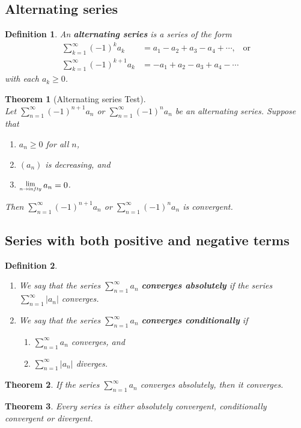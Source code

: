 \documentclass[8pt]{article}
\newcommand{\Lim}[1]{\raisebox{0.5ex}{\scalebox{0.8}{$\displaystyle \lim_{#1}\;$}}}
\newtheorem{definition}{Definition}[section]
\newtheorem{theorem}{Theorem}[section]
\theoremstyle{definition}
\begin{document}
\subsection{Alternating series}
\begin{definition}\normalfont An \textbf{alternating series} is a series of the form
\[
\begin{aligned}
\sum_{k=1}^\infty (-1)^k a_k&=a_1-a_2+a_3-a_4+\cdots,\;\;\;\text{or}\\
\sum_{k=1}^\infty (-1)^{k+1} a_k&=-a_1+a_2-a_3+a_4-\cdots
\end{aligned}
\]
with each $a_k\geq 0$.
\end{definition}
\begin{theorem}[Alternating series Test]
\hfill\\\normalfont Let $\sum_{n=1}^\infty (-1)^{n+1}a_n$ or $\sum_{n=1}^\infty (-1)^{n}a_n$ be an alternating series. Suppose that
\begin{enumerate}
\item $a_n\geq 0$ for all $n$,
\item $(a_n)$ is decreasing, and
\item $\Lim{n\to infty}a_n = 0$.
\end{enumerate}
Then $\sum_{n=1}^\infty (-1)^{n+1}a_n$ or $\sum_{n=1}^\infty (-1)^{n}a_n$ is convergent.
\end{theorem}
\subsection{Series with both positive and negative terms}
\begin{definition}\hfill\\\normalfont
\begin{enumerate}
\item We say that the series $\sum_{n=1}^\infty a_n$ \textbf{converges absolutely} if the series $\sum_{n=1}^\infty |a_n|$ converges.
\item We say that the series $\sum_{n=1}^\infty a_n$ \textbf{converges conditionally} if 
\begin{enumerate}
\item $\sum_{n=1}^\infty a_n$ converges, and
\item $\sum_{n=1}^\infty |a_n|$ diverges.
\end{enumerate}
\end{enumerate}
\end{definition}
\begin{theorem}\normalfont If the series $\sum_{n=1}^\infty a_n$ converges absolutely, then it converges.
\end{theorem}
\begin{theorem}\normalfont Every series is either absolutely convergent, conditionally convergent or divergent.
\end{theorem}
\end{document}
